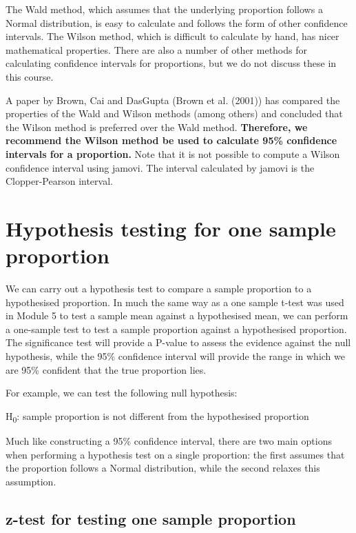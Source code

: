 \documentclass[
  a4paper,
]{memoir}
\begin{document}
The Wald method, which assumes that the underlying proportion follows a
Normal distribution, is easy to calculate and follows the form of other
confidence intervals. The Wilson method, which is difficult to calculate
by hand, has nicer mathematical properties. There are also a number of
other methods for calculating confidence intervals for proportions, but
we do not discuss these in this course.

A paper by Brown, Cai and DasGupta (Brown et al. (2001)) has compared
the properties of the Wald and Wilson methods (among others) and
concluded that the Wilson method is preferred over the Wald method.
\textbf{Therefore, we recommend the Wilson method be used to calculate
95\% confidence intervals for a proportion.} Note that it is not
possible to compute a Wilson confidence interval using jamovi. The
interval calculated by jamovi is the Clopper-Pearson interval.

\section{Hypothesis testing for one sample
proportion}\label{hypothesis-testing-for-one-sample-proportion}

We can carry out a hypothesis test to compare a sample proportion to a
hypothesised proportion. In much the same way as a one sample t-test was
used in Module 5 to test a sample mean against a hypothesised mean, we
can perform a one-sample test to test a sample proportion against a
hypothesised proportion. The significance test will provide a P-value to
assess the evidence against the null hypothesis, while the 95\%
confidence interval will provide the range in which we are 95\%
confident that the true proportion lies.

For example, we can test the following null hypothesis:

H\textsubscript{0}: sample proportion is not different from the
hypothesised proportion

Much like constructing a 95\% confidence interval, there are two main
options when performing a hypothesis test on a single proportion: the
first assumes that the proportion follows a Normal distribution, while
the second relaxes this assumption.

\subsection{z-test for testing one sample
proportion}\label{z-test-for-testing-one-sample-proportion}
\end{document}
